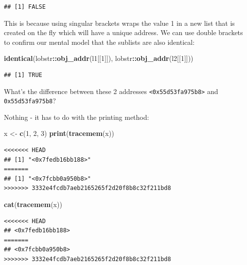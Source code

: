 \documentclass[]{book}
\newenvironment{Shaded}{\begin{snugshade}}{\end{snugshade}}
\newcommand{\DecValTok}[1]{\textcolor[rgb]{0.00,0.00,0.81}{#1}}
\newcommand{\KeywordTok}[1]{\textcolor[rgb]{0.13,0.29,0.53}{\textbf{#1}}}
\newcommand{\NormalTok}[1]{#1}
\newcommand{\OperatorTok}[1]{\textcolor[rgb]{0.81,0.36,0.00}{\textbf{#1}}}
\newcommand{\StringTok}[1]{\textcolor[rgb]{0.31,0.60,0.02}{#1}}
\begin{document}
\begin{verbatim}
## [1] FALSE
\end{verbatim}

This is because using singular brackets wraps the value 1 in a new list that is created on the fly which will have a unique address. We can use double brackets to confirm our mental model that the sublists are also identical:

\begin{Shaded}
\begin{Highlighting}[]
\KeywordTok{identical}\NormalTok{(lobstr}\OperatorTok{::}\KeywordTok{obj_addr}\NormalTok{(l1[[}\DecValTok{1}\NormalTok{]]), lobstr}\OperatorTok{::}\KeywordTok{obj_addr}\NormalTok{(l2[[}\DecValTok{1}\NormalTok{]]))}
\end{Highlighting}
\end{Shaded}

\begin{verbatim}
## [1] TRUE
\end{verbatim}

What's the difference between these 2 addresses \texttt{\textless{}0x55d53fa975b8\textgreater{}} and \texttt{0x55d53fa975b8}?

Nothing - it has to do with the printing method:

\begin{Shaded}
\begin{Highlighting}[]
\NormalTok{x <-}\StringTok{ }\KeywordTok{c}\NormalTok{(}\DecValTok{1}\NormalTok{, }\DecValTok{2}\NormalTok{, }\DecValTok{3}\NormalTok{)}
\KeywordTok{print}\NormalTok{(}\KeywordTok{tracemem}\NormalTok{(x))}
\end{Highlighting}
\end{Shaded}

\begin{verbatim}
<<<<<<< HEAD
## [1] "<0x7fedb16bb188>"
=======
## [1] "<0x7fcbb0a950b8>"
>>>>>>> 3332e4fcdb7aeb2165265f2d20f8b8c32f211bd8
\end{verbatim}

\begin{Shaded}
\begin{Highlighting}[]
\KeywordTok{cat}\NormalTok{(}\KeywordTok{tracemem}\NormalTok{(x))}
\end{Highlighting}
\end{Shaded}

\begin{verbatim}
<<<<<<< HEAD
## <0x7fedb16bb188>
=======
## <0x7fcbb0a950b8>
>>>>>>> 3332e4fcdb7aeb2165265f2d20f8b8c32f211bd8
\end{verbatim}
\end{document}
